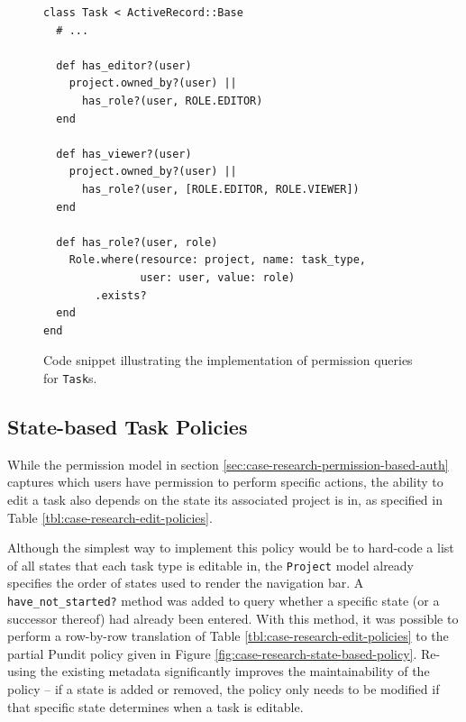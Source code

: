 \documentclass[document.tex]{subfiles}
\begin{document}
\begin{figure}[!ht]
  \begin{lstlisting}
class Task < ActiveRecord::Base
  # ...

  def has_editor?(user)
    project.owned_by?(user) ||
      has_role?(user, ROLE.EDITOR)
  end

  def has_viewer?(user)
    project.owned_by?(user) ||
      has_role?(user, [ROLE.EDITOR, ROLE.VIEWER])
  end

  def has_role?(user, role)
    Role.where(resource: project, name: task_type,
               user: user, value: role)
        .exists?
  end
end
  \end{lstlisting}
  \cprotect\caption{Code snippet illustrating the implementation of permission queries for \verb!Task!s.}
  \label{fig:case-research-permission-code-example}
\end{figure}

\FloatBarrier

\subsection {State-based Task Policies}

While the permission model in section \ref{sec:case-research-permission-based-auth} captures which users have permission to perform specific actions, the ability to edit a task also depends on the state its associated project is in, as specified in Table \ref{tbl:case-research-edit-policies}.

Although the simplest way to implement this policy would be to hard-code a list of all states that each task type is editable in, the \verb!Project! model already specifies the order of states used to render the navigation bar.
A \verb!have_not_started?! method was added to query whether a specific state (or a successor thereof) had already been entered.
With this method, it was possible to perform a row-by-row translation of Table \ref{tbl:case-research-edit-policies} to the partial Pundit policy given in Figure \ref{fig:case-research-state-based-policy}.
Re-using the existing metadata significantly improves the maintainability of the policy -- if a state is added or removed, the policy only needs to be modified if that specific state determines when a task is editable.
\end{document}
